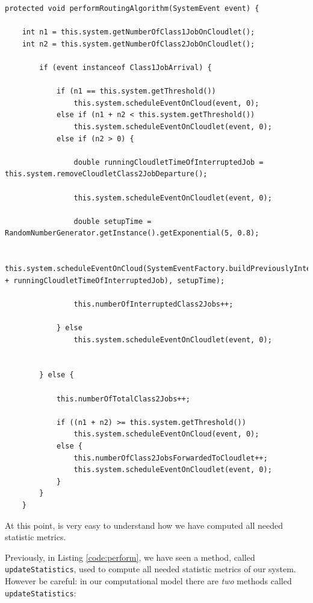 \documentclass[10pt,a4paper]{article}
\begin{document}
\begin{lstlisting}[frame=lines, caption={\texttt{performRoutingAlgorithm} method implementation concerning access control algorithm 2.},label={code:performRoutingAlgorithm2}]
protected void performRoutingAlgorithm(SystemEvent event) {

    int n1 = this.system.getNumberOfClass1JobOnCloudlet();
    int n2 = this.system.getNumberOfClass2JobOnCloudlet();

        if (event instanceof Class1JobArrival) {

            if (n1 == this.system.getThreshold())
                this.system.scheduleEventOnCloud(event, 0);
            else if (n1 + n2 < this.system.getThreshold())
                this.system.scheduleEventOnCloudlet(event, 0);
            else if (n2 > 0) {

                double runningCloudletTimeOfInterruptedJob = this.system.removeCloudletClass2JobDeparture();

                this.system.scheduleEventOnCloudlet(event, 0);

                double setupTime = RandomNumberGenerator.getInstance().getExponential(5, 0.8);

                this.system.scheduleEventOnCloud(SystemEventFactory.buildPreviouslyInterruptedClass2JobArrival(setupTime + runningCloudletTimeOfInterruptedJob), setupTime);

                this.numberOfInterruptedClass2Jobs++;

            } else
                this.system.scheduleEventOnCloudlet(event, 0);


        } else {

            this.numberOfTotalClass2Jobs++;

            if ((n1 + n2) >= this.system.getThreshold())
                this.system.scheduleEventOnCloud(event, 0);
            else {
                this.numberOfClass2JobsForwardedToCloudlet++;
                this.system.scheduleEventOnCloudlet(event, 0);
            }
        }
    }
\end{lstlisting}

At this point, is very easy to understand how we have computed all needed statistic metrics. 

Previously, in Listing \ref{code:perform}, we have seen a method, called \texttt{updateStatistics}, used to compute all needed statistic metrics of our system. However be careful: in our computational model there are \textit{two} methods called \texttt{updateStatistics}:
\end{document}
